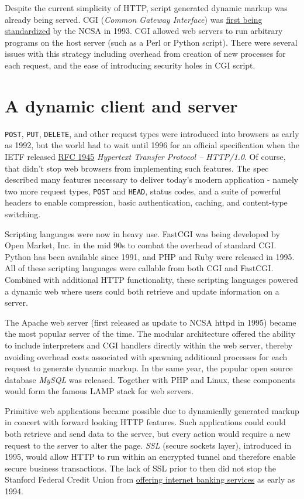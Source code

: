 \documentclass[12pt,letterpaper,fleqn]{article}
\newcommand{\jurl}[2]{\textcolor{myblue}{\href{#2}{#1}}}
\newcommand{\code}[1]{\texttt{#1}}
\begin{document}
Despite the current simplicity of HTTP, script generated dynamic markup was already being served. CGI (\textit{Common Gateway Interface}) was \jurl{first being standardized}{http://en.wikipedia.org/wiki/Common_Gateway_Interface} by the NCSA in 1993. CGI allowed web servers to run arbitrary programs on the host server (such as a Perl or Python script). There were several issues with this strategy including overhead from creation of new processes for each request, and the ease of introducing security holes in CGI script.


\section*{A dynamic client and server}

\code{POST}, \code{PUT}, \code{DELETE}, and other request types were introduced into browsers as early as 1992, but the world had to wait until 1996 for an official specification when the IETF released \jurl{RFC 1945}{http://tools.ietf.org/html/rfc1945} \textit{Hypertext Transfer Protocol -- HTTP/1.0}. Of course, that didn't stop web browsers from implementing such features. The spec described many features necessary to deliver today's modern application - namely two more request types, \code{POST} and \code{HEAD}, status codes, and a suite of powerful headers to enable compression, basic authentication, caching, and content-type switching.

Scripting languages were now in heavy use. FastCGI was being developed by Open Market, Inc. in the mid 90s to combat the overhead of standard CGI. Python has been available since 1991, and PHP and Ruby were released in 1995. All of these scripting languages were callable from both CGI and FastCGI. Combined with additional HTTP functionality, these scripting languages powered a dynamic web where users could both retrieve and update information on a server.

The Apache web server (first released as update to NCSA httpd in 1995) became the most popular server of the time. The modular architecture offered the ability to include interpreters and CGI handlers directly within the web server, thereby avoiding overhead costs associated with spawning additional processes for each request to generate dynamic markup. In the same year, the popular open source database \textit{MySQL} was released. Together with PHP and Linux, these components would form the famous LAMP stack for web servers.

Primitive web applications became possible due to dynamically generated markup in concert with forward looking HTTP features. Such applications could could both retrieve and send data to the server, but every action would require a new request to the server to alter the page. \textit{SSL} (secure sockets layer), introduced in 1995, would allow HTTP to run within an encrypted tunnel and therefore enable secure business transactions. The lack of SSL prior to then did not stop the Stanford Federal Credit Union from \jurl{offering internet banking services}{http://en.wikipedia.org/wiki/Online_banking} as early as 1994.
\end{document}
